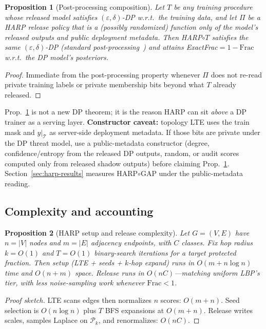 \documentclass[conference]{IEEEtran}
\newtheorem{proposition}{Proposition}
\begin{document}
\begin{proposition}[Post-processing composition]
\label{thm:compose}
Let $T$ be any training procedure whose released model satisfies $(\varepsilon,\delta)$-DP w.r.t.\ the training data, and let $\Pi$ be a HARP release policy that is a (possibly randomized) function only of the model's released outputs and \emph{public} deployment metadata.
Then HARP$\circ T$ satisfies the same $(\varepsilon,\delta)$-DP (standard post-processing~\cite{dwork2006dp}) and attains ExactFrac${=}1-\mathrm{Frac}$ w.r.t.\ the DP model's posteriors.
\end{proposition}
\begin{proof}
Immediate from the post-processing property whenever $\Pi$ does not re-read private training labels or private membership bits beyond what $T$ already released.
\end{proof}
Prop.~\ref{thm:compose} is not a new DP theorem; it is the reason HARP can sit \emph{above} a DP trainer as a serving layer.
\textbf{Constructor caveat:} topology LTE uses the train mask and $y|_{\mathcal{T}}$ as server-side deployment metadata.
If those bits are private under the DP threat model, use a public-metadata constructor (degree, confidence/entropy from the released DP outputs, random, or audit scores computed only from released shadow outputs) before claiming Prop.~\ref{thm:compose}.
Section~\ref{sec:harp-results} measures HARP$\circ$GAP under the public-metadata reading.

\subsection{Complexity and accounting}
\label{sec:complexity}
\begin{proposition}[HARP setup and release complexity]
\label{thm:harp-complexity}
Let $G=(V,E)$ have $n=|V|$ nodes and $m=|E|$ adjacency endpoints, with $C$ classes.
Fix hop radius $k=O(1)$ and $T=O(1)$ binary-search iterations for a target protected fraction.
Then setup (LTE + seeds + $k$-hop expand) runs in $O(m + n\log n)$ time and $O(n+m)$ space.
Release runs in $O(nC)$---matching uniform LBP's tier, with less noise-sampling work whenever $\mathrm{Frac}<1$.
\end{proposition}
\begin{proof}[Proof sketch]
LTE scans edges then normalizes $n$ scores: $O(m+n)$.
Seed selection is $O(n\log n)$ plus $T$ BFS expansions at $O(m+n)$.
Release writes scales, samples Laplace on $\mathcal{P}_k$, and renormalizes: $O(nC)$.
\end{proof}
\end{document}
